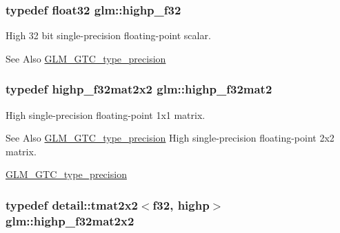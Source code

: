 \hypertarget{group__gtc__type__precision_ga48d80b6fd3a40b71b2e414493832d1ca}{
\subsubsection[{highp\-\_\-f32}]{\setlength{\rightskip}{0pt plus 5cm}typedef float32 {\bf glm\-::highp\-\_\-f32}}}\label{group__gtc__type__precision_ga48d80b6fd3a40b71b2e414493832d1ca}
High 32 bit single-\/precision floating-\/point scalar. \begin{DoxySeeAlso}{See Also}
\hyperlink{group__gtc__type__precision}{G\-L\-M\-\_\-\-G\-T\-C\-\_\-type\-\_\-precision} 
\end{DoxySeeAlso}
\hypertarget{group__gtc__type__precision_gaed934f561aaf8ad891c0a8f5e719aea8}{
\subsubsection[{highp\-\_\-f32mat2}]{\setlength{\rightskip}{0pt plus 5cm}typedef highp\-\_\-f32mat2x2 {\bf glm\-::highp\-\_\-f32mat2}}}\label{group__gtc__type__precision_gaed934f561aaf8ad891c0a8f5e719aea8}
High single-\/precision floating-\/point 1x1 matrix. \begin{DoxySeeAlso}{See Also}
\hyperlink{group__gtc__type__precision}{G\-L\-M\-\_\-\-G\-T\-C\-\_\-type\-\_\-precision} High single-\/precision floating-\/point 2x2 matrix. 

\hyperlink{group__gtc__type__precision}{G\-L\-M\-\_\-\-G\-T\-C\-\_\-type\-\_\-precision} 
\end{DoxySeeAlso}
\hypertarget{group__gtc__type__precision_gaf3a2cc948ca6fd168391138ce6fdd100}{
\subsubsection[{highp\-\_\-f32mat2x2}]{\setlength{\rightskip}{0pt plus 5cm}typedef detail\-::tmat2x2$<$f32, highp$>$ {\bf glm\-::highp\-\_\-f32mat2x2}}}\label{group__gtc__type__precision_gaf3a2cc948ca6fd168391138ce6fdd100}
